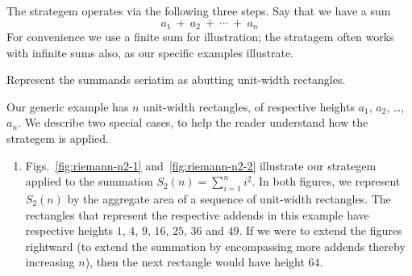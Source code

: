 The strategem operates via the following three steps.  Say that we
have a sum
\[ a_1 \ + \ a_2 \ + \ \cdots \ + \ a_n \]
For convenience we use a finite sum for illustration; the stratagem
often works with infinite sums also, as our specific examples
illustrate.

Represent the summands seriatim as abutting unit-width rectangles.  

\noindent
Our generic example has $n$ unit-width rectangles, of respective
heights $a_1$, $a_2$, \ldots, $a_n$.  We describe two special cases,
to help the reader understand how the strategem is applied.
\begin{enumerate}
\item
Figs.~\ref{fig:riemann-n2-1} and~\ref{fig:riemann-n2-2} illustrate our
strategem applied to the summation $S_2(n) = \sum_{i=1}^n i^2$.  In
both figures, we represent $S_2(n)$ by the aggregate area of a
sequence of unit-width rectangles.  The rectangles that represent the
respective addends in this example have respective heights $1$, $4$,
$9$, $16$, $25$, $36$ and $49$.  If we were to extend the figures
rightward (to extend the summation by encompassing more addends
thereby increasing $n$), then the next rectangle would have height
$64$.


\end{enumerate}
